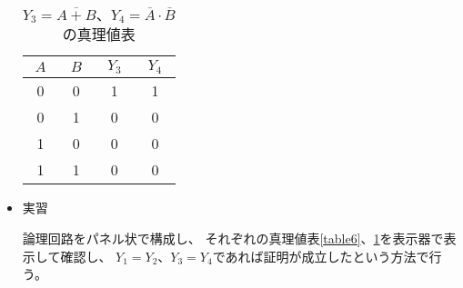 \documentclass[12pt]{jarticle}
\begin{document}
\begin{itemize}
          \begin{table}[h]
              \caption{$Y_3= \overline{A + B}、Y_4 = \overline{A} \cdot \overline{B}$の真理値表}
              \begin{center}
                  \begin{tabular}{|c|c|c|c|}
                      \hline
                      $A$ & $B$ & $Y_3$ & $Y_4$ \\
                      \hline
                      0   & 0   & 1     & 1     \\
                      \hline
                      0   & 1   & 0     & 0     \\
                      \hline
                      1   & 0   & 0     & 0     \\
                      \hline
                      1   & 1   & 0     & 0     \\
                      \hline
                  \end{tabular}
              \end{center}
              \label{table7}
          \end{table}

    \item 実習

          論理回路をパネル状で構成し、
          それぞれの真理値表\ref{table6}、\ref{table7}を表示器で表示して確認し、
          $Y_1 = Y_2$、$Y_3 = Y_4$であれば証明が成立したという方法で行う。
\end{itemize}
\end{document}
